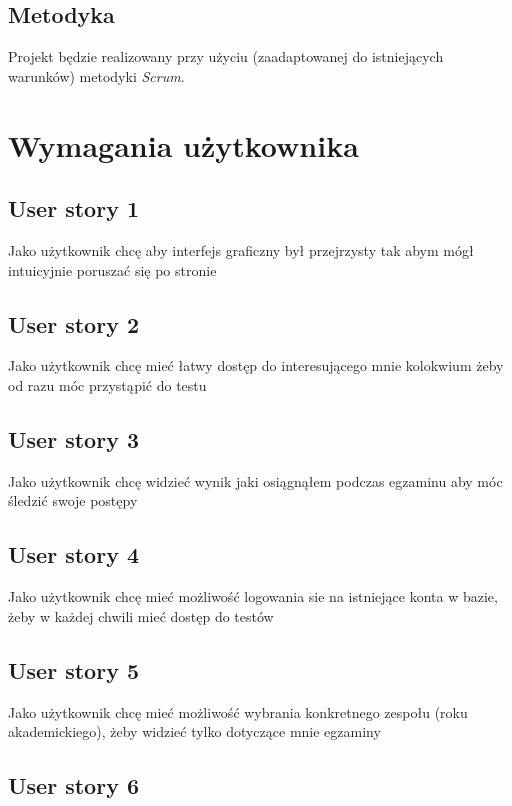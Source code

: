 \documentclass[a4paper]{article}
\begin{document}
\subsection{Metodyka}

Projekt będzie realizowany przy użyciu (zaadaptowanej do istniejących warunków) metodyki {\em Scrum}. 

\section{Wymagania użytkownika}
\subsection{User story 1}

Jako użytkownik chcę aby interfejs graficzny był przejrzysty tak abym mógł intuicyjnie poruszać się po stronie

\subsection{User story 2}

Jako użytkownik chcę mieć łatwy dostęp do interesującego mnie kolokwium żeby od razu móc przystąpić do testu

\subsection{User story 3}

Jako użytkownik chcę widzieć wynik jaki osiągnąłem podczas egzaminu aby móc śledzić swoje postępy

\subsection{User story 4}

Jako użytkownik chcę mieć możliwość logowania sie na istniejące konta w bazie, żeby w każdej chwili mieć dostęp do testów

\subsection{User story 5}

Jako użytkownik chcę mieć możliwość wybrania konkretnego zespołu (roku akademickiego), żeby widzieć tylko dotyczące mnie egzaminy

\subsection{User story 6}
\end{document}
